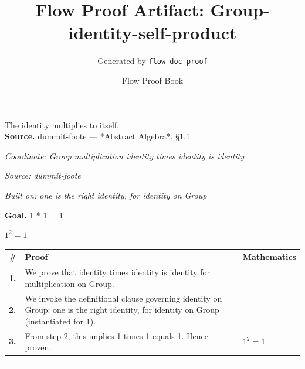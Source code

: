 \documentclass[11pt]{article}
\title{Flow Proof Artifact: Group-identity-self-product}
\author{Generated by \texttt{flow doc proof}}
\date{Flow Proof Book}
\theoremstyle{definition}
\begin{document}
\maketitle
The identity multiplies to itself.\\[0.5em]
\textbf{Source.} dummit-foote — *Abstract Algebra*, §1.1\\[0.5em]
\bigskip
{}\par
\smallskip\noindent\textit{Coordinate: Group \cdot multiplication \cdot identity times identity is identity}\par
\smallskip\noindent\textit{Source: dummit-foote}\par
\smallskip\noindent\textit{Built on: one is the right identity, for identity on Group}\par
\medskip
\noindent\textbf{Goal.} 1 * 1 = 1\par
\noindent$\displaystyle 1^{2} = 1$\par
\medskip
\noindent
\begin{tabular}{@{} >{\raggedright\arraybackslash}p{} >{\raggedright\arraybackslash}p{} >{\raggedleft\arraybackslash}p{} @{}}
\textbf{\#} & \textbf{Proof} & \textbf{Mathematics} \\
\midrule
\textbf{1.} & We prove that identity times identity is identity for multiplication on Group. & \\[0.45em]
\textbf{2.} & We invoke the definitional clause governing identity on Group: one is the right identity, for identity on Group (instantiated for 1). & \\[0.45em]
\textbf{3.} & From step 2, this implies 1 times 1 equals 1. Hence proven. & $\displaystyle 1^{2} = 1$ \\[0.45em]
\bottomrule
\end{tabular}
\label{thm:Group-multiplication-identity_times_identity_is_identity}
\par\medskip\hrule
\end{document}
